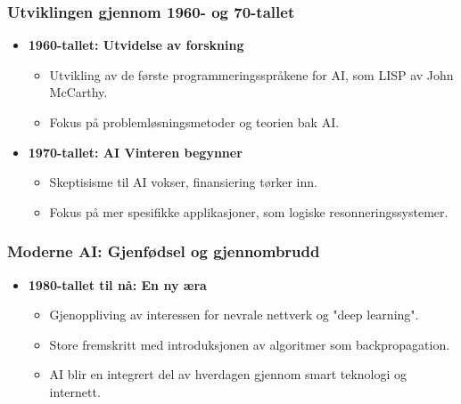 \documentclass[aspectratio=169]{beamer}
\begin{document}
\begin{frame}
    \frametitle{Utviklingen gjennom 1960- og 70-tallet}

    \begin{itemize}
        \item \textbf{1960-tallet: Utvidelse av forskning}
              \begin{itemize}
                  \item Utvikling av de første programmeringsspråkene for AI, som LISP av John McCarthy.
                  \item Fokus på problemløsningsmetoder og teorien bak AI.
              \end{itemize}

        \item \textbf{1970-tallet: AI Vinteren begynner}
              \begin{itemize}
                  \item Skeptisisme til AI vokser, finansiering tørker inn.
                  \item Fokus på mer spesifikke applikasjoner, som logiske resonneringssystemer.
              \end{itemize}
    \end{itemize}

\end{frame}

\begin{frame}
    \frametitle{Moderne AI: Gjenfødsel og gjennombrudd}

    \begin{itemize}
        \item \textbf{1980-tallet til nå: En ny æra}
              \begin{itemize}
                  \item Gjenoppliving av interessen for nevrale nettverk og "deep learning".
                  \item Store fremskritt med introduksjonen av algoritmer som backpropagation.
                  \item AI blir en integrert del av hverdagen gjennom smart teknologi og internett.
              \end{itemize}
    \end{itemize}

\end{frame}
\end{document}
